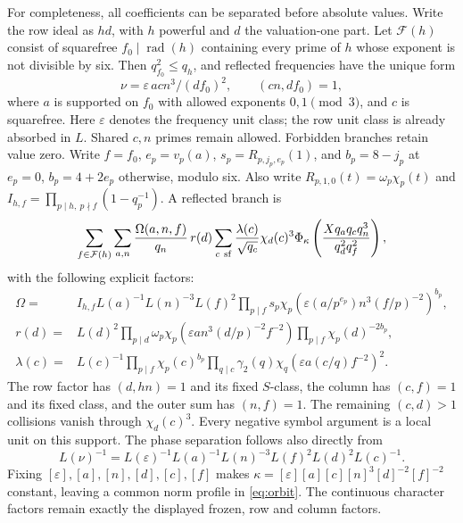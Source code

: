 \documentclass[11pt,a4paper]{article}
\numberwithin{equation}{section}
\theoremstyle{definition}
\theoremstyle{remark}
\newcommand{\rad}{\operatorname{rad}}
\begin{document}
For completeness, all coefficients can be separated before absolute values. Write the row ideal as $hd$, with $h$ powerful and $d$ the valuation-one part. Let $\mathcal F(h)$ consist of squarefree $f_0\mid\rad(h)$ containing every prime of $h$ whose exponent is not divisible by six. Then $q_{f_0}^2\le q_h$, and reflected frequencies have the unique form
\[
 \nu=\varepsilon\,acn^3/(df_0)^2,\qquad
 (cn,df_0)=1,
\]
where $a$ is supported on $f_0$ with allowed exponents $0,1\pmod3$, and $c$ is squarefree. Here $\varepsilon$ denotes the frequency unit class; the row unit class is already absorbed in $L$. Shared $c,n$ primes remain allowed. Forbidden branches retain value zero. Write $f=f_0$, $e_p=v_p(a)$, $s_p=R_{p,j_p,e_p}(1)$, and
$b_{p}=8-j_p$ at $e_p=0$, $b_p=4+2e_p$ otherwise, modulo six. Also write $R_{p,1,0}(t)=\omega_p\chi_p(t)$ and
$I_{h,f}=\prod_{p\mid h,\ p\nmid f}(1-q_p^{-1})$. A reflected branch is
\begin{equation}\label{eq:reflected}
 \sum_{f\in\mathcal F(h)}\sum_{a,n}
 \frac{\Omega(a,n,f)}{q_n}\,r(d)
 \sum_{c\ {\rm sf}}\frac{\lambda(c)}{\sqrt{q_c}}\chi_d(c)^3
     \Phi_{\kappa}\left(\frac{Xq_aq_cq_n^3}{q_d^2q_f^2}\right),
\end{equation}
with the following explicit factors:
\begin{align*}
 \Omega={}&I_{h,f}L(a)^{-1}L(n)^{-3}L(f)^2
 \prod_{p\mid f}s_p
 \chi_p\left(\varepsilon(a/p^{e_p})n^3(f/p)^{-2}\right)^{b_p},\\
 r(d)={}&L(d)^2\prod_{p\mid d}\omega_p
 \chi_p\left(\varepsilon an^3(d/p)^{-2}f^{-2}\right)
 \prod_{p\mid f}\chi_p(d)^{-2b_p},\\
 \lambda(c)={}&L(c)^{-1}\prod_{p\mid f}\chi_p(c)^{b_p}
 \prod_{q\mid c}\gamma_2(q)
          \chi_q\left(\varepsilon a(c/q)f^{-2}\right)^2 .
\end{align*}
The row factor has $(d,hn)=1$ and its fixed $S$-class, the column has $(c,f)=1$ and its fixed class, and the outer sum has $(n,f)=1$. The remaining $(c,d)>1$ collisions vanish through $\chi_d(c)^3$. Every negative symbol argument is a local unit on this support. The phase separation follows also directly from
\[
 L(\nu)^{-1}=L(\varepsilon)^{-1}L(a)^{-1}L(n)^{-3}L(f)^2
                         L(d)^2L(c)^{-1}.
\]
Fixing $[\varepsilon],[a],[n],[d],[c],[f]$ makes
$\kappa=[\varepsilon][a][c][n]^3[d]^{-2}[f]^{-2}$ constant, leaving a common norm profile in \eqref{eq:orbit}. The continuous character factors remain exactly the displayed frozen, row and column factors.
\end{document}
